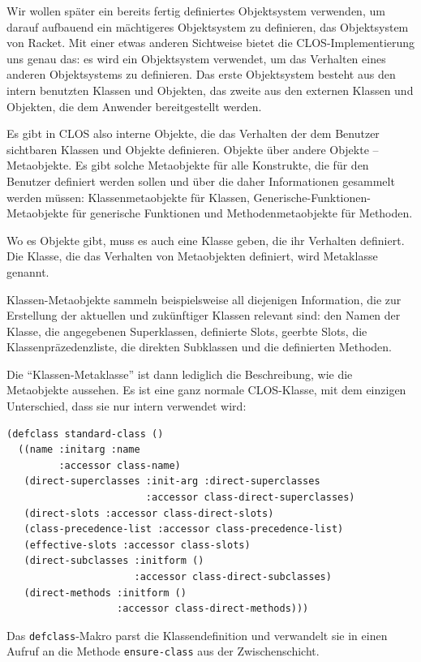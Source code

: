 Wir wollen später ein bereits fertig definiertes Objektsystem verwenden, um darauf aufbauend ein mächtigeres Objektsystem zu definieren, das Objektsystem von Racket. Mit einer etwas anderen Sichtweise bietet die CLOS-Implementierung uns genau das: es wird ein Objektsystem verwendet, um das Verhalten eines anderen Objektsystems zu definieren. Das erste Objektsystem besteht aus den intern benutzten Klassen und Objekten, das zweite aus den externen Klassen und Objekten, die dem Anwender bereitgestellt werden.

Es gibt in CLOS also interne Objekte, die das Verhalten der dem Benutzer sichtbaren Klassen und Objekte definieren. Objekte über andere Objekte -- Metaobjekte. Es gibt solche Metaobjekte für alle Konstrukte, die für den Benutzer definiert werden sollen und über die daher Informationen gesammelt werden müssen: Klassenmetaobjekte für Klassen, Generische-Funktionen-Metaobjekte für generische Funktionen und Methodenmetaobjekte für Methoden. 

Wo es Objekte gibt, muss es auch eine Klasse geben, die ihr Verhalten definiert. Die Klasse, die das Verhalten von Metaobjekten definiert, wird Metaklasse genannt. 

Klassen-Metaobjekte sammeln beispielsweise all diejenigen Information, die zur Erstellung der aktuellen und zukünftiger Klassen relevant sind: den Namen der Klasse, die angegebenen Superklassen, definierte Slots, geerbte Slots, die Klassenpräzedenzliste, die direkten Subklassen und die definierten Methoden. 

Die ``Klassen-Metaklasse'' ist dann lediglich die Beschreibung, wie die Metaobjekte aussehen. Es ist eine ganz normale CLOS-Klasse, mit dem einzigen Unterschied, dass sie nur intern verwendet wird:

\begin{lstlisting}
(defclass standard-class ()
  ((name :initarg :name
         :accessor class-name)
   (direct-superclasses :init-arg :direct-superclasses
                        :accessor class-direct-superclasses)
   (direct-slots :accessor class-direct-slots)
   (class-precedence-list :accessor class-precedence-list)
   (effective-slots :accessor class-slots)
   (direct-subclasses :initform ()
                      :accessor class-direct-subclasses)
   (direct-methods :initform ()
                   :accessor class-direct-methods)))
\end{lstlisting}

Das \texttt{defclass}-Makro parst die Klassendefinition und verwandelt sie in einen Aufruf an die Methode \texttt{ensure-class} aus der Zwischenschicht. 

